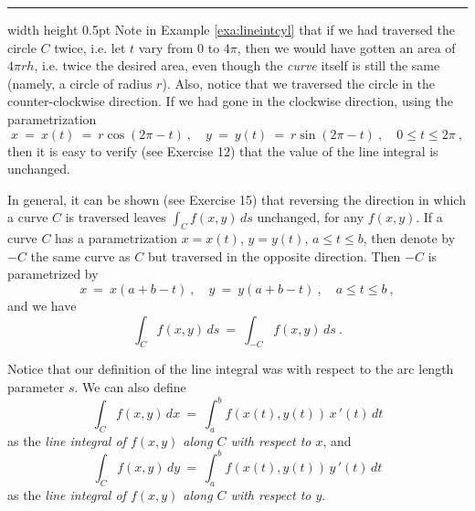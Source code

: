 \hrule width \textwidth height 0.5pt
   Note in Example \ref{exa:lineintcyl} that if we had traversed the circle $C$ twice, i.e. let $t$ vary from $0$
to $4\pi$, then we would have gotten an area of $4\pi r h$, i.e. twice the desired area, even though the \emph{curve}
itself is still the same (namely, a circle of radius $r$). Also, notice that we traversed the circle in the
counter-clockwise direction. If we had gone in the clockwise direction, using the parametrization
\begin{equation}\label{eqn:lineintcylcwise}
 x ~=~ x(t) ~=~ r \cos (2\pi - t) ~,\quad y ~=~ y(t) ~=~ r \sin (2\pi - t)~,\quad 0 \le t \le 2\pi ~,
\end{equation}
then it is easy to verify (see Exercise 12) that the value of the line integral is unchanged.

In general, it can be shown
(see Exercise 15) that reversing the direction in which a curve $C$ is traversed leaves $\int_C f(x,y)\,ds$ unchanged,
for any $f(x,y)$. If a curve $C$ has a parametrization $x=x(t)$, $y=y(t)$, $a \le t \le b$, then denote by $-C$ the
same curve as $C$ but traversed in the opposite direction. Then $-C$ is parametrized by
\begin{equation}\label{eqn:reversec}
 x ~=~ x(a+b-t)~,\quad y ~=~ y(a+b-t)~,\quad a \le t \le b ~,
\end{equation}
and we have
\begin{equation}
 \int_C f(x,y)\,ds ~=~ \int_{-C} f(x,y)\,ds ~.
\end{equation}

Notice that our definition of the line integral was with respect to the arc length parameter $s$. We can also
define
\begin{equation}\label{eqn:lineintx2}
 \int_C f(x,y)\,dx ~=~ \int_a^b f(x(t),y(t)) \,x\,'(t)\,dt
\end{equation}
as the \emph{line integral of $f(x,y)$ along $C$ with respect to $x$}, and
\begin{equation}\label{eqn:lineinty2}
 \int_C f(x,y)\,dy ~=~ \int_a^b f(x(t),y(t)) \,y\,'(t)\,dt
\end{equation}
as the \emph{line integral of $f(x,y)$ along $C$ with respect to $y$}.

